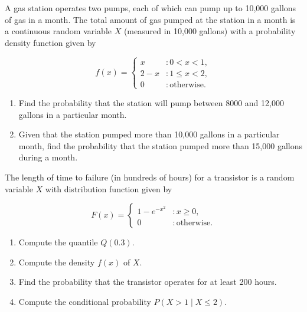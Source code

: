 \documentclass[12pt,reqno]{amsart}
\begin{document}
\bigskip
\prob A gas station operates two pumps, each of which can pump up to 10,000 gallons of gas in a month. The total amount of gas pumped at the station in a month is a continuous random variable $X$ (measured in 10,000 gallons) with a probability density function given by

    \[f(x) = \begin{cases}
        x & : 0 < x < 1, \\
        2-x & : 1 \leq x < 2, \\
        0 & : \text{otherwise}.
    \end{cases}\]

\medskip
\begin{enumerate}
    \item Find the probability that the station will pump between 8000 and 12,000 gallons in a particular month.\vfill
    
    

    \item Given that the station pumped more than 10,000 gallons in a particular month, find the probability that the station pumped more than 15,000 gallons during a month.\vfill
    
    
\end{enumerate}









\newpage
\prob The length of time to failure (in hundreds of hours) for a transistor is a random variable $X$ with
distribution function given by

    \[F(x) = \begin{cases}
        1 - e^{-x^2} & : x\geq 0, \\
        0 & : \text{otherwise}.
    \end{cases}\]

\medskip
\begin{enumerate}
    \item Compute the quantile $Q(0.3)$.\vfill
    
    

    \item Compute the density $f(x)$ of $X$.\vfill
    
    

    \item Find the probability that the transistor operates for at least 200 hours.\vfill
    
    

    \item Compute the conditional probability $P(X>1 \mid X\leq 2)$.\vfill
    
    
\end{enumerate}
\end{document}
